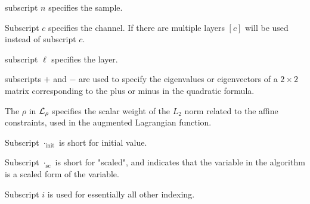 \documentclass{article}
\begin{document}
subscript $n$ specifies the sample.

Subscript $c$ specifies the channel. If there are multiple layers $[c]$ will be used instead of subscript $c$.

subscript $\ell$ specifies the layer.

subscripts $+$ and $-$ are used to specify the eigenvalues or eigenvectors of a $2 \times 2$ matrix corresponding to the plus or minus in the quadratic formula.

The $\rho$ in $\mathcal{L}_{\rho}$ specifies the scalar weight of the $L_2$ norm related to the affine constraints, used in the augmented Lagrangian function.

Subscript $\cdot_{\text{init}}$ is short for initial value.

Subscript $\cdot_{\text{sc}}$ is short for "scaled", and indicates that the variable in the algorithm is a scaled form of the variable.

Subscript $i$ is used for essentially all other indexing.
\end{document}
